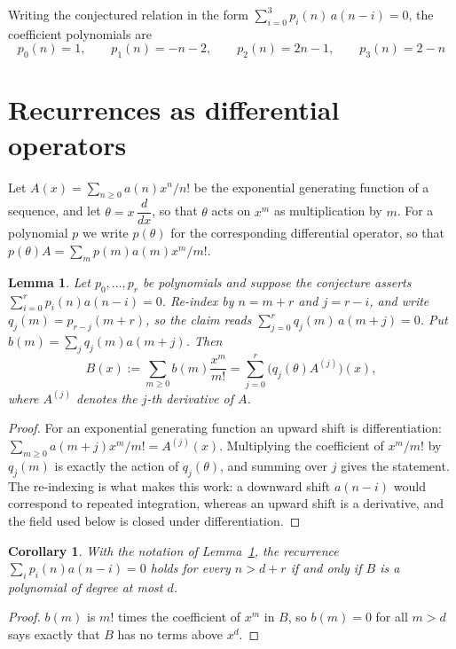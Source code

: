 \documentclass[11pt,a4paper]{article}
\theoremstyle{plain}
\newtheorem{lemma}[theorem]{Lemma}
\newtheorem{corollary}[theorem]{Corollary}
\theoremstyle{definition}
\begin{document}
Writing the conjectured relation in the form $\sum_{i=0}^{3}p_{i}(n)\,a(n-i)=0$,
the coefficient polynomials are
\[
p_{0}(n)=1,\qquad p_{1}(n)=- n - 2,\qquad p_{2}(n)=2 n - 1,\qquad p_{3}(n)=2 - n
\]

\section{Recurrences as differential operators}

Let $A(x)=\sum_{n\ge0}a(n)x^{n}/n!$ be the exponential generating function of a sequence, and let
$\theta=x\,\dfrac{d}{dx}$, so that $\theta$ acts on $x^{m}$ as multiplication by $m$. For a
polynomial $p$ we write $p(\theta)$ for the corresponding differential operator, so that
$p(\theta)A=\sum_{m}p(m)a(m)x^{m}/m!$.

\begin{lemma}\label{lem:transfer}
Let $p_{0},\dots,p_{r}$ be polynomials and suppose the conjecture asserts
$\sum_{i=0}^{r}p_{i}(n)a(n-i)=0$. Re-index by $n=m+r$ and $j=r-i$, and write
$q_{j}(m)=p_{r-j}(m+r)$, so the claim reads $\sum_{j=0}^{r}q_{j}(m)\,a(m+j)=0$. Put
$b(m)=\sum_{j}q_{j}(m)a(m+j)$. Then
\[
B(x):=\sum_{m\ge0}b(m)\frac{x^{m}}{m!}=\sum_{j=0}^{r}\bigl(q_{j}(\theta)A^{(j)}\bigr)(x),
\]
where $A^{(j)}$ denotes the $j$-th derivative of $A$.
\end{lemma}

\begin{proof}
For an exponential generating function an upward shift is differentiation:
$\sum_{m\ge0}a(m+j)x^{m}/m!=A^{(j)}(x)$. Multiplying the coefficient of $x^{m}/m!$ by
$q_{j}(m)$ is exactly the action of $q_{j}(\theta)$, and summing over $j$ gives the
statement. The re-indexing is what makes this work: a downward shift $a(n-i)$ would
correspond to repeated integration, whereas an upward shift is a derivative, and the
field used below is closed under differentiation.
\end{proof}

\begin{corollary}\label{cor:criterion}
With the notation of Lemma~\ref{lem:transfer}, the recurrence
$\sum_{i}p_{i}(n)a(n-i)=0$ holds for every $n>d+r$ if and only if $B$ is a polynomial of
degree at most $d$.
\end{corollary}

\begin{proof}
$b(m)$ is $m!$ times the coefficient of $x^{m}$ in $B$, so $b(m)=0$ for all $m>d$ says
exactly that $B$ has no terms above $x^{d}$.
\end{proof}
\end{document}
